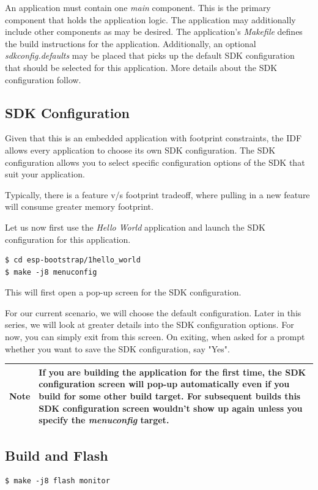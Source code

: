 \documentclass[11pt,fleqn]{book} %
\newcommand{\ksnotebox}[1]{\begin{tabularx}{\textwidth}{ |c|X| }
\hline
\cellcolor{lightgray} \textbf{Note} & #1 \\
\hline
\end{tabularx}} %
\begin{document}
An application must contain one \textit{main} component. This is the primary component that holds the application logic. The application may additionally include other components as may be desired.
The application's \textit{Makefile} defines the build instructions for the application. 
Additionally, an optional \textit{sdkconfig.defaults} may be placed that picks up the default SDK configuration that should be selected for this application. More details about the SDK configuration follow.

\subsection{SDK Configuration}

Given that this is an embedded application with footprint constraints, the IDF allows every application to choose its own SDK configuration. The SDK configuration allows you to select specific configuration options of the SDK that suit your application.

Typically, there is a feature v/s footprint tradeoff, where pulling in a new feature will consume greater memory footprint.

Let us now first use the \textit{Hello World} application and launch the SDK configuration for this application.

\begin{verbatim}
$ cd esp-bootstrap/1hello_world
$ make -j8 menuconfig
\end{verbatim}

This will first open a pop-up screen for the SDK configuration.

For our current scenario, we will choose the default configuration. Later in this series, we will look at greater details into the SDK configuration options. For now, you can simply exit from this screen. On exiting, when asked for a prompt whether you want to save the SDK configuration, say "Yes".

\ksnotebox{If you are building the application for the first time, the SDK configuration screen will pop-up automatically even if you build for some other build target. For subsequent builds this SDK configuration screen wouldn't show up again unless you specify the \textit{menuconfig} target.}

\subsection{Build and Flash}
\begin{verbatim}
$ make -j8 flash monitor
\end{verbatim}
\end{document}
